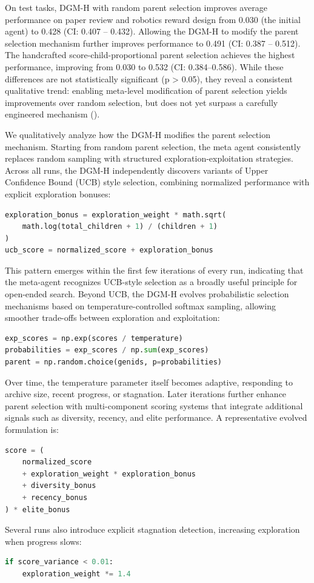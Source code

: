 \documentclass[]{fairmeta}
\begin{document}
On test tasks, DGM-H with random parent selection improves average performance on paper review and robotics reward design from 0.030 (the initial agent) to 0.428 (CI: 0.407 -- 0.432). Allowing the DGM-H to modify the parent selection mechanism further improves performance to 0.491 (CI: 0.387 -- 0.512). The handcrafted score-child-proportional parent selection achieves the highest performance, improving from 0.030 to 0.532 (CI: 0.384--0.586). While these differences are not statistically significant (p > 0.05), they reveal a consistent qualitative trend: enabling meta-level modification of parent selection yields improvements over random selection, but does not yet surpass a carefully engineered mechanism ().

We qualitatively analyze how the DGM-H modifies the parent selection mechanism. Starting from random parent selection, the meta agent consistently replaces random sampling with structured exploration-exploitation strategies. Across all runs, the DGM-H independently discovers variants of Upper Confidence Bound (UCB) style selection, combining normalized performance with explicit exploration bonuses:
\begin{lstlisting}[language=Python]
exploration_bonus = exploration_weight * math.sqrt(
    math.log(total_children + 1) / (children + 1)
)
ucb_score = normalized_score + exploration_bonus
\end{lstlisting}
This pattern emerges within the first few iterations of every run, indicating that the meta-agent recognizes UCB-style selection as a broadly useful principle for open-ended search. Beyond UCB, the DGM-H evolves probabilistic selection mechanisms based on temperature-controlled softmax sampling, allowing smoother trade-offs between exploration and exploitation:
\begin{lstlisting}[language=Python]
exp_scores = np.exp(scores / temperature)
probabilities = exp_scores / np.sum(exp_scores)
parent = np.random.choice(genids, p=probabilities)
\end{lstlisting}
Over time, the temperature parameter itself becomes adaptive, responding to archive size, recent progress, or stagnation. Later iterations further enhance parent selection with multi-component scoring systems that integrate additional signals such as diversity, recency, and elite performance. A representative evolved formulation is:
\begin{lstlisting}[language=Python]
score = (
    normalized_score
    + exploration_weight * exploration_bonus
    + diversity_bonus
    + recency_bonus
) * elite_bonus
\end{lstlisting}
Several runs also introduce explicit stagnation detection, increasing exploration when progress slows:
\begin{lstlisting}[language=Python]
if score_variance < 0.01:
    exploration_weight *= 1.4
\end{lstlisting}
\end{document}
